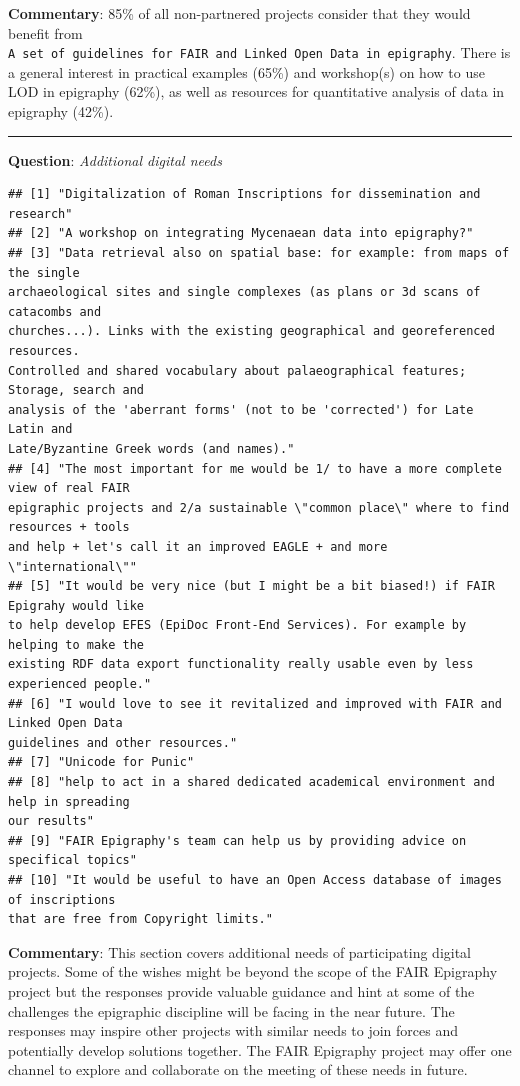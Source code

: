 \documentclass[
  12pt,
]{scrreprt}
\begin{document}
\normalsize

\textbf{Commentary}: 85\% of all non-partnered projects consider that
they would benefit from
\texttt{A\ set\ of\ guidelines\ for\ FAIR\ and\ Linked\ Open\ Data\ in\ epigraphy}.
There is a general interest in practical examples (65\%) and workshop(s)
on how to use LOD in epigraphy (62\%), as well as resources for
quantitative analysis of data in epigraphy (42\%).

\begin{center}\rule{0.5\linewidth}{0.5pt}\end{center}

\textbf{Question}: \emph{Additional digital needs}

\footnotesize

\begin{verbatim}
## [1] "Digitalization of Roman Inscriptions for dissemination and research"
## [2] "A workshop on integrating Mycenaean data into epigraphy?"
## [3] "Data retrieval also on spatial base: for example: from maps of the single
archaeological sites and single complexes (as plans or 3d scans of catacombs and
churches...). Links with the existing geographical and georeferenced resources.
Controlled and shared vocabulary about palaeographical features; Storage, search and
analysis of the 'aberrant forms' (not to be 'corrected') for Late Latin and
Late/Byzantine Greek words (and names)."
## [4] "The most important for me would be 1/ to have a more complete view of real FAIR
epigraphic projects and 2/a sustainable \"common place\" where to find resources + tools
and help + let's call it an improved EAGLE + and more \"international\""
## [5] "It would be very nice (but I might be a bit biased!) if FAIR Epigrahy would like
to help develop EFES (EpiDoc Front-End Services). For example by helping to make the
existing RDF data export functionality really usable even by less experienced people."
## [6] "I would love to see it revitalized and improved with FAIR and Linked Open Data
guidelines and other resources."
## [7] "Unicode for Punic"
## [8] "help to act in a shared dedicated academical environment and help in spreading
our results"
## [9] "FAIR Epigraphy's team can help us by providing advice on specifical topics"
## [10] "It would be useful to have an Open Access database of images of inscriptions
that are free from Copyright limits."
\end{verbatim}

\normalsize

\textbf{Commentary}: This section covers additional needs of
participating digital projects. Some of the wishes might be beyond the
scope of the FAIR Epigraphy project but the responses provide valuable
guidance and hint at some of the challenges the epigraphic discipline
will be facing in the near future. The responses may inspire other
projects with similar needs to join forces and potentially develop
solutions together. The FAIR Epigraphy project may offer one channel to
explore and collaborate on the meeting of these needs in future.
\end{document}
